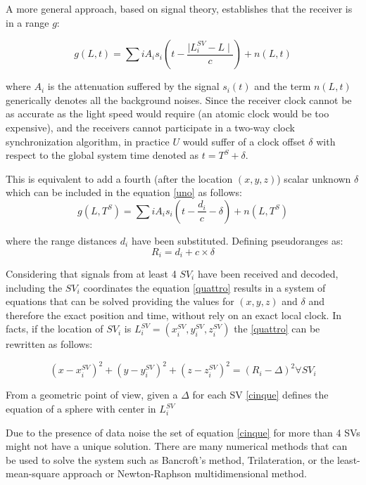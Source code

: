 \documentclass[PhD,binding=0.6cm]{dithesis}
\begin{document}
A more general approach, based on signal theory, establishes that the receiver is in a range $ g $:

\begin{equation}
g(L,t) = \sum \limits{i} A_i s_i \left( t - \frac {\mid L_i^{SV} - L \mid} { c } \right) + n( L, t)
\label{uno}
\end{equation}

where $A_i$ is the attenuation suffered by the signal $s_i(t)$ and the term $n(L, t)$ generically denotes all the background noises.
Since the receiver clock cannot be as accurate as the light speed would require (an atomic clock would be too expensive), and the receivers cannot participate in a two-way clock synchronization algorithm, in practice $U$ would suffer of a clock offset $\delta$ with respect to the global system time denoted as $ t = T^S + \delta $.

This is equivalent to add a fourth (after the location $(x,y,z)$) scalar unknown  $\delta$ which can be included in the equation \ref{uno} as follows:
\begin{equation}
g(L, T^S) = \sum \limits{i} A_i s_i \left( t - \frac {d_i} { c } - \delta \right) + n( L, T^S)
\label{tre}
\end{equation}

where the range distances $d_i$ have been substituted. Defining pseudoranges as:
\begin{equation}
R_i = d_i + c \times \delta 
\label{quattro}
\end{equation}

Considering that signals from at least 4 $SV{_i}$ have been received and decoded, including the $SV_i $ coordinates the equation \ref{quattro} results in a system of equations that can be solved providing the values for $(x, y, z)$ and $\delta$  and therefore the exact position and time, without rely on an exact local clock.
In facts, if the location of $SV_i$ is $ L_i^{SV} = (x_i^{SV}, y_i^{SV}, z_i^{SV})$  the \ref{quattro} can be rewritten as follows:

\begin{equation}
(x - x_i^{SV})^2 + (y - y_i^{SV})^2 + (z - z_i^{SV})^2 = (R_i - \Delta)^2  \forall SV_i 
\label{cinque}
\end{equation}

From a geometric point of view, given a $\Delta$ for each SV \ref{cinque} defines the equation of a sphere with center in $ L_i^{SV}$

Due to the presence of data noise the set of equation \ref{cinque} for more than 4 SVs might not have a unique solution. 
There are many numerical methods that can be used to solve the system such as Bancroft's method, Trilateration, or the least-mean-square approach or Newton-Raphson multidimensional method.
\end{document}
